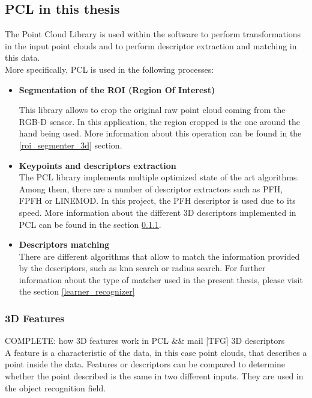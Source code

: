 \subsection{PCL in this thesis}
The Point Cloud Library is used within the software to perform transformations in the input point clouds and to perform descriptor extraction and matching in this data. 
\\

More specifically, PCL is used in the following processes: 

\begin{itemize}
	\item\textbf{Segmentation of the ROI (Region Of Interest)\\ }

	This library allows to crop the original raw point cloud coming from the RGB-D sensor. In this application, the region cropped is the one around the hand being used. More information about this operation can be found in the \ref{roi_segmenter_3d} section. 
	

	\item\textbf{ {Keypoints and descriptors extraction\\ }}
	 The PCL library implements multiple optimized state of the art algorithms. Among them, there are a number of descriptor extractors such as PFH, FPFH or LINEMOD. In this project, the PFH descriptor is used due to its speed. More information about the different 3D descriptors implemented in PCL can be found in the section \ref{3d_features}.


	\item \textbf{{Descriptors matching\\ }}
	There are different algorithms that allow to match the information provided by the descriptors, such as knn search or radius search. For further information about the type of matcher used in the present thesis, please visit the section \ref{learner_recognizer}
\end{itemize}


\subsubsection{3D Features}
\label{3d_features}
COMPLETE: how 3D features work in PCL  &&  mail [TFG] 3D descriptors
\\

A feature is a characteristic of the data, in this case point clouds, that describes a point inside the data. Features or descriptors can be compared to determine whether the point described is the same in two different inputs. They are used in the object recognition field. 
\\

